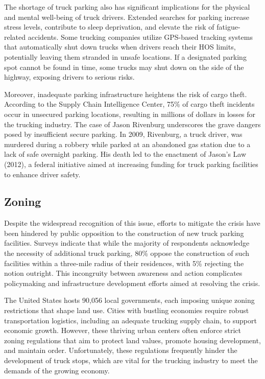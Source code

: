 \documentclass[
  12pt]{article}
\begin{document}
The shortage of truck parking also has significant implications for the
physical and mental well-being of truck drivers. Extended searches for
parking increase stress levels, contribute to sleep deprivation, and
elevate the risk of fatigue-related accidents. Some trucking companies
utilize GPS-based tracking systems that automatically shut down trucks
when drivers reach their HOS limits, potentially leaving them stranded
in unsafe locations. If a designated parking spot cannot be found in
time, some trucks may shut down on the side of the highway, exposing
drivers to serious risks.

Moreover, inadequate parking infrastructure heightens the risk of cargo
theft. According to the Supply Chain Intelligence Center, 75\% of cargo
theft incidents occur in unsecured parking locations, resulting in
millions of dollars in losses for the trucking industry. The case of
Jason Rivenburg underscores the grave dangers posed by insufficient
secure parking. In 2009, Rivenburg, a truck driver, was murdered during
a robbery while parked at an abandoned gas station due to a lack of safe
overnight parking. His death led to the enactment of Jason's Law (2012),
a federal initiative aimed at increasing funding for truck parking
facilities to enhance driver safety.

\hypertarget{zoning}{%
\subsection{Zoning}\label{zoning}}

Despite the widespread recognition of this issue, efforts to mitigate
the crisis have been hindered by public opposition to the construction
of new truck parking facilities. Surveys indicate that while the
majority of respondents acknowledge the necessity of additional truck
parking, 80\% oppose the construction of such facilities within a
three-mile radius of their residences, with 5\% rejecting the notion
outright. This incongruity between awareness and action complicates
policymaking and infrastructure development efforts aimed at resolving
the crisis.

The United States hosts 90,056 local governments, each imposing unique
zoning restrictions that shape land use. Cities with bustling economies
require robust transportation logistics, including an adequate trucking
supply chain, to support economic growth. However, these thriving urban
centers often enforce strict zoning regulations that aim to protect land
values, promote housing development, and maintain order. Unfortunately,
these regulations frequently hinder the development of truck stops,
which are vital for the trucking industry to meet the demands of the
growing economy.
\end{document}

